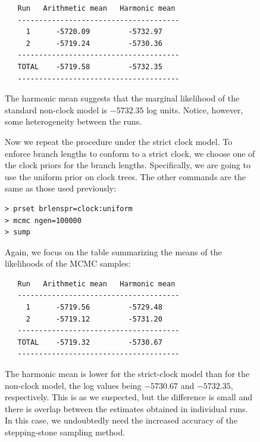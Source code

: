 \documentclass[12pt]{book}
\begin{document}
\begin{figure}[h]
\begin{singlespacing}
\footnotesize
\begin{verbatim}
   Run   Arithmetic mean   Harmonic mean
   --------------------------------------
     1      -5720.09         -5732.97
     2      -5719.24         -5730.36
   --------------------------------------
   TOTAL    -5719.58         -5732.35
   --------------------------------------
\end{verbatim}
\end{singlespacing}
\normalsize

The harmonic mean suggests that the marginal likelihood of the standard non-clock model is
$-5732.35$ log units. Notice, however, some heterogeneity between the runs.

Now we repeat the procedure under the strict clock model. To enforce branch lengths to conform to a
strict clock, we choose one of the clock priors for the branch lengths. Specifically, we are going
to use the uniform prior on clock trees. The other commands are the same as those used previously:

\begin{singlespacing}\small
\begin{verbatim}
> prset brlenspr=clock:uniform
> mcmc ngen=100000
> sump
\end{verbatim}
\end{singlespacing}
\normalsize

Again, we focus on the table summarizing the means of the likelihoods of the MCMC samples:

\begin{singlespacing}
\footnotesize
\begin{verbatim}
   Run   Arithmetic mean   Harmonic mean
   --------------------------------------
     1      -5719.56         -5729.48
     2      -5719.12         -5731.20
   --------------------------------------
   TOTAL    -5719.32         -5730.67
   --------------------------------------
\end{verbatim}
\end{singlespacing}
\normalsize

The harmonic mean is lower for the strict-clock model than for the non-clock model, the log values
being $-5730.67$ and $-5732.35$, respectively. This is as we suspected, but the difference is small
and there is overlap between the estimates obtained in individual runs. In this case, we
undoubtedly need the increased accuracy of the stepping-stone sampling method.


\end{figure}
\end{document}
